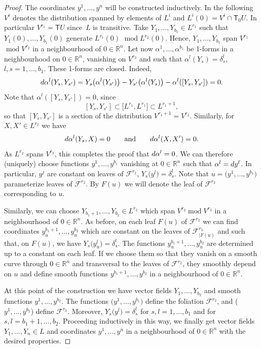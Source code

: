\documentclass[11pt]{article}
\numberwithin{equation}{section}
\numberwithin{equation}{section}
\begin{document}
\begin{proof} The coordinates $y^1,\ldots, y^n$ will be constructed inductively. In the following $V^i$ denotes the distribution spanned by elements of $L^i$ and $L^i(0)=V^i\cap{\mathsf T}_0 U$. In particular $V^{r_1}={\mathsf T} U$ since~$L$ is transitive.
Take $Y_1,\dots,Y_{b_1}\in L^{r_1}$ such that $Y_1(0),\dots,Y_{b_1}(0)$ generate $L^{r_1}(0)$ $\operatorname{mod} L^{r_2}(0)$. Hence, $Y_1,\dots,Y_{b_1}$ span $V^{r_1}$ $\operatorname{mod} V^{r_2}$ in a neighbourhood of $0\in{\mathbb R}^n$.
Let now $\alpha^1,\dots,\alpha^{b_1}$ be 1-forms in a neighbourhood on $0\in{\mathbb R}^n$, vanishing on $V^{r_2}$ and such that
$\alpha^l(Y_s)=\delta^l_s$, $l,s=1,\dots, b_1$. These 1-forms are closed. Indeed,
\[ {\rm d}\alpha^l(Y_s,Y_{s'})=Y_s\big(\alpha^l(Y_{s'})\big)- Y_{s'}\big(\alpha^l(Y_{s})\big)-\alpha^l([Y_s,Y_{s'}])=0 .\] Note that $\alpha^l([Y_s,Y_{s'}])=0$, since
\[ [Y_s,Y_{s'}]\subset \big[L^{r_1},L^{r_1}\big]\subset L^{r_1+1},\]
so that $[Y_s,Y_{s'}]$ is a section of the distribution $V^{r_1+1}=V^{r_2}$.
Similarly, for $X,X'\in L^{r_2}$ we have
\[ {\rm d}\alpha^l(Y_s,X)=0 \qquad\text{and}\qquad {\rm d}\alpha^l(X,X')=0 .\]
As $L^{r_2}$ spans $V^{r_2}$, this completes the proof that ${\rm d}\alpha^l=0$.
We can therefore (uniquely) choose functions $y^1,\dots,y^{b_1}$ vanishing at $0\in{\mathbb R}^n$ such that $\alpha^l={\rm d} y^l$. In particular, $y^j$ are constant on leaves of ${\mathcal F}^{r_2}$, $Y_s\big(y^l\big)=\delta^l_s$. Note that $u=\big(y^1,\ldots, y^{b_1}\big)$ parameterize leaves of ${\mathcal F}^{r_2}$. By $F(u)$ we will denote the leaf of ${\mathcal F}^{r_2}$ corresponding to $u$.

Similarly, we can choose $Y_{b_1+1},\dots,Y_{b_2}\in L^{r_2}$ which span $V^{r_2} \operatorname{mod} V^{r_3}$ in a neighbourhood of $0\in{\mathbb R}^n$. As before, on each leaf $F(u)$ of ${\mathcal F}^{r_2}$ we can find coordinates $y^{b_1+1}_u,\dots,y_u^{b_2}$ which are constant on the leaves of ${\mathcal F}^{r_3}_{|F(u)}$ and such that, on $F(u)$, we have $Y_s\big(y^l_u\big)=\delta^l_s$. The functions $y^{b_1+1}_u,\dots,y_u^{b_2}$ are determined up to a constant on each leaf. If we choose them so that they vanish on a smooth curve through $0\in{\mathbb R}^n$ and transversal to the leaves of ${\mathcal F}^{r_2}$, they smoothly depend on $u$ and define smooth functions $y^{b_1+1},\dots,y^{b_2}$ in a neighbourhood of $0\in{\mathbb R}^n$.

At this point of the construction we have vector fields $Y_1,\dots,Y_{b_2}$ and smooth functions $y^1,\dots,y^{b_2}$. The functions $\big(y^1,\dots,y^{b_1}\big)$ define the foliation ${\mathcal F}^{r_2}$, and ($y^1,\dots,y^{b_2}$) define ${\mathcal F}^{r_3}$. Moreover, $Y_s\big(y^l\big)=\delta^l_s$ for $s,l=1,\dots,b_1$ and for $s,l=b_1+1,\dots,b_2$.
Proceeding inductively in this way, we finally get vector fields $Y_1,\dots,Y_n\in L$ and coordinates $y^1,\dots,y^n$ in a neighbourhood of $0\in{\mathbb R}^n$ with the desired properties.


\end{proof}
\end{document}
